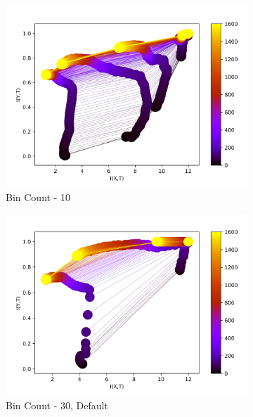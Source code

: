 \documentclass[dissertation.tex]{subfiles}
\begin{document}
\begin{figure}[ht]
  \centering
  \begin{subfigure}[t]{0.24\textwidth}
    \centering
    \includegraphics[width=\textwidth]{figs/eval/binCount/Binning10.png}
    \caption{
      Bin Count - 10
    }
    \label{figBinCount10}
  \end{subfigure}
  \hfill
  \begin{subfigure}[t]{0.24\textwidth}
    \centering
    \includegraphics[width=\textwidth]{figs/eval/binCount/Binning30.png}
    \caption{
      Bin Count - 30, Default
    }
    \label{figBinCount30}
  \end{subfigure}
  \hfill
  \begin{subfigure}[t]{0.24\textwidth}

\end{subfigure}
\end{figure}
\end{document}
